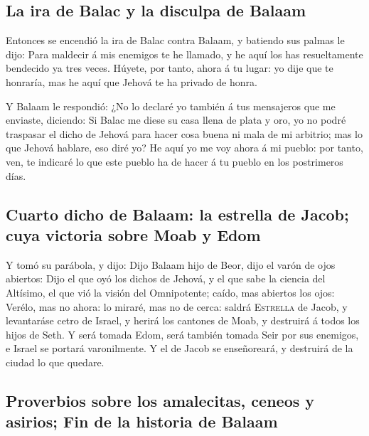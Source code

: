 \hypertarget{la-ira-de-balac-y-la-disculpa-de-balaam}{%
\subsection{La ira de Balac y la disculpa de
Balaam}\label{la-ira-de-balac-y-la-disculpa-de-balaam}}

 Entonces se encendió la ira de Balac contra Balaam, y
batiendo sus palmas le dijo: Para maldecir á mis enemigos te he llamado,
y he aquí los has resueltamente bendecido ya tres veces. 
Húyete, por tanto, ahora á tu lugar: yo dije que te honraría, mas he
aquí que Jehová te ha privado de honra.

 Y Balaam le respondió: ¿No lo declaré yo también á tus
mensajeros que me enviaste, diciendo:  Si Balac me diese
su casa llena de plata y oro, yo no podré traspasar el dicho de Jehová
para hacer cosa buena ni mala de mi arbitrio; mas lo que Jehová hablare,
eso diré yo?  He aquí yo me voy ahora á mi pueblo: por
tanto, ven, te indicaré lo que este pueblo ha de hacer á tu pueblo en
los postrimeros días.

\hypertarget{cuarto-dicho-de-balaam-la-estrella-de-jacob-cuya-victoria-sobre-moab-y-edom}{%
\subsection{Cuarto dicho de Balaam: la estrella de Jacob; cuya victoria
sobre Moab y
Edom}\label{cuarto-dicho-de-balaam-la-estrella-de-jacob-cuya-victoria-sobre-moab-y-edom}}

 Y tomó su parábola, y dijo: Dijo Balaam hijo de Beor,
dijo el varón de ojos abiertos:  Dijo el que oyó los
dichos de Jehová, y el que sabe la ciencia del Altísimo, el que vió la
visión del Omnipotente; caído, mas abiertos los ojos: 
Verélo, mas no ahora: lo miraré, mas no de cerca: saldrá
\textsc{Estrella} de Jacob, y levantaráse cetro de Israel, y herirá los
cantones de Moab, y destruirá á todos los hijos de Seth. 
Y será tomada Edom, será también tomada Seir por sus enemigos, e Israel
se portará varonilmente.  Y el de Jacob se enseñoreará, y
destruirá de la ciudad lo que quedare.

\hypertarget{proverbios-sobre-los-amalecitas-ceneos-y-asirios-fin-de-la-historia-de-balaam}{%
\subsection{Proverbios sobre los amalecitas, ceneos y asirios; Fin de la
historia de
Balaam}\label{proverbios-sobre-los-amalecitas-ceneos-y-asirios-fin-de-la-historia-de-balaam}}

